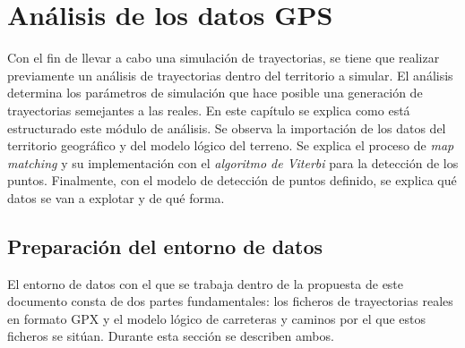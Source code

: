 
\chapter{Análisis de los datos GPS}  \label{chapter:DataAnalysis}
Con el fin de llevar a cabo una simulación de trayectorias, se tiene que realizar 
previamente un análisis de trayectorias dentro del territorio a simular. El análisis 
determina los parámetros de simulación que hace posible una generación de 
trayectorias semejantes a las reales. En este capítulo se explica como está estructurado 
este módulo de análisis. Se observa la importación de los datos del territorio geográfico 
y del modelo lógico del terreno. Se explica el proceso de \textit{map matching} y su 
implementación con el \textit{algoritmo de Viterbi} para la detección de los puntos. 
Finalmente, con el modelo de detección de puntos definido, se explica qué datos se 
van a explotar y de qué forma.


\section{Preparación del entorno de datos}
El entorno de datos con el que se trabaja dentro de la propuesta de este documento 
consta de dos partes fundamentales: los ficheros de trayectorias reales en formato
\ac{GPX} y el modelo lógico de carreteras y caminos por el que estos ficheros 
se sitúan. Durante esta sección se describen ambos.

